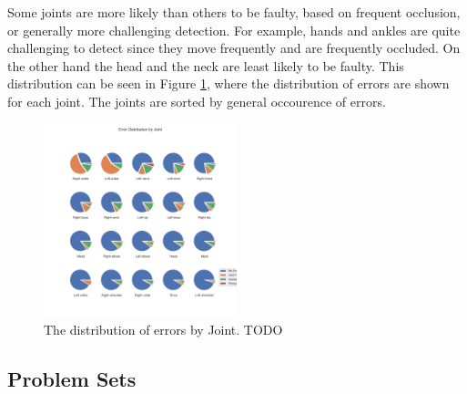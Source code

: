 Some joints are more likely than others to be faulty, based on frequent occlusion, or generally more challenging detection. For example, hands and ankles are quite challenging to detect since they move frequently and are frequently occluded. On the other hand the head and the neck are least likely to be faulty. This distribution can be seen in Figure \ref{fig:statistics_err_dist_joint}, where the distribution of errors are shown for each joint. The joints are sorted by general occourence of errors.

\begin{figure}
  \centering
  \includegraphics[width=0.5\textwidth]{figures/Data/Error_Distribution_by_Joint.png}
  \caption[Error Distribution by Joint]{The distribution of errors by Joint. TODO}
  \label{fig:statistics_err_dist_joint}
\end{figure}

\subsection{Problem Sets}
\label{sec:problem_set}